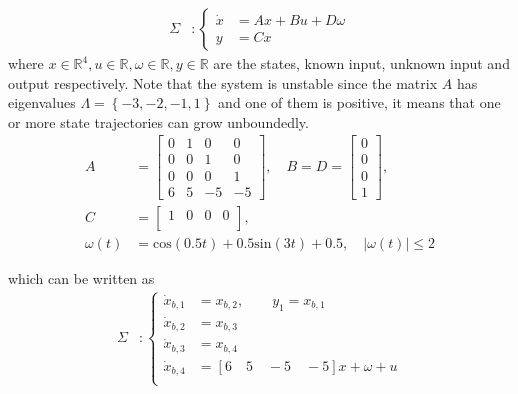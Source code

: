 \documentclass[11pt,letterpaper,twoside,openright]{report}
\newcommand{\RE}{\mathbb{R}}
\begin{document}
\begin{equation}\label{ecu: CH3 System example 1}
	\begin{split}
		\Sigma &: \left\{
		\begin{array}{rl}
			\dot{x} &= Ax + Bu + D\omega \\
			y &= Cx
		\end{array}
		\right.
	\end{split}
\end{equation}
where $x\in \RE^4, u \in \RE, \omega\in \RE,y\in \RE$ are the states, known input, unknown input and output respectively. Note that the system is unstable since the matrix $A$ has eigenvalues $\Lambda=\left\lbrace -3,-2,-1,1 \right\rbrace$ and one of them is positive, it means that one or more state trajectories can grow unboundedly. 
\begin{equation}
	\begin{split}
		A &=\begin{bmatrix} 
			0 & 1 & 0 & 0 \\
			0 & 0 & 1 & 0 \\
			0 & 0 & 0 & 1 \\
			6 & 5 & -5 & -5 
		\end{bmatrix}, \quad 
		B=D=\begin{bmatrix} 
			0 \\
			0 \\
			0 \\
			1
		\end{bmatrix}, \\
		C &=\begin{bmatrix}
			1 & 0 & 0 & 0 \\ 
		\end{bmatrix}, \\ \omega(t) &= \text{cos}(0.5t) + 0.5 \text{sin}(3t) + 0.5, \quad |\omega(t)| \leq 2
	\end{split}
\end{equation}

which can be written as
\begin{equation}
	\begin{split}
		\Sigma &: \left\{
		\begin{array}{rl}
			\dot{x}_{b,1} &= x_{b,2},\qquad y_1=x_{b,1}  \\
			\dot{x}_{b,2} &= x_{b,3} \\
			\dot{x}_{b,3} &= x_{b,4} \\
			\dot{x}_{b,4} &= [6 \quad 5 \quad -5 \quad -5]x + \omega + u\\
		\end{array}
		\right.
	\end{split}
\end{equation}
\end{document}
